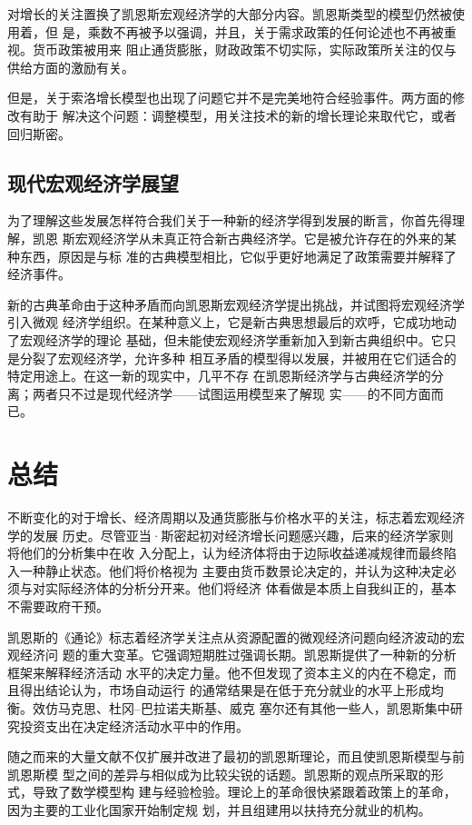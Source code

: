 对增长的关注置换了凯恩斯宏观经济学的大部分内容。凯恩斯类型的模型仍然被使用着，但
是，乘数不再被予以强调，并且，关于需求政策的任何论述也不再被重视。货币政策被用来
阻止通货膨胀，财政政策不切实际，实际政策所关注的仅与供给方面的激励有关。

但是，关于索洛增长模型也出现了问题它并不是完美地符合经验事件。两方面的修改有助于
解决这个问题：调整模型，用关注技术的新的增长理论来取代它，或者回归斯密。

\subsection{现代宏观经济学展望}

为了理解这些发展怎样符合我们关于一种新的经济学得到发展的断言，你首先得理解，凯恩
斯宏观经济学从未真正符合新古典经济学。它是被允许存在的外来的某种东西，原因是与标
准的古典模型相比，它似乎更好地满足了政策需要并解释了经济事件。

新的古典革命由于这种矛盾而向凯恩斯宏观经济学提出挑战，并试图将宏观经济学引入微观
经济学组织。在某种意义上，它是新古典思想最后的欢呼，它成功地动了宏观经济学的理论
基础，但未能使宏观经济学重新加入到新古典组织中。它只是分裂了宏观经济学，允许多种
相互矛盾的模型得以发展，并被用在它们适合的特定用途上。在这一新的现实中，几平不存
在凯恩斯经济学与古典经济学的分离；两者只不过是现代经济学——试图运用模型来了解现
实——的不同方面而已。

\section{总结}

不断变化的对于增长、经济周期以及通货膨胀与价格水平的关注，标志着宏观经济学的发展
历史。尽管亚当·斯密起初对经济增长问题感兴趣，后来的经济学家则将他们的分析集中在收
入分配上，认为经济体将由于边际收益递减规律而最终陷入一种静止状态。他们将价格视为
主要由货币数景论决定的，并认为这种决定必须与对实际经济体的分析分开来。他们将经济
体看做是本质上自我纠正的，基本不需要政府干预。

凯恩斯的《通论》标志着经济学关注点从资源配置的微观经济问题向经济波动的宏观经济问
题的重大变革。它强调短期胜过强调长期。凯恩斯提供了一种新的分析框架来解释经济活动
水平的决定力量。他不但发现了资本主义的内在不稳定，而且得出结论认为，市场自动运行
的通常结果是在低于充分就业的水平上形成均衡。效仿马克思、杜冈--巴拉诺夫斯基、威克
塞尔还有其他一些人，凯恩斯集中研究投资支出在决定经济活动水平中的作用。

随之而来的大量文献不仅扩展并改进了最初的凯恩斯理论，而且使凯恩斯模型与前凯恩斯模
型之间的差异与相似成为比较尖锐的话题。凯恩斯的观点所采取的形式，导致了数学模型构
建与经验检验。理论上的革命很快紧跟着政策上的革命，因为主要的工业化国家开始制定规
划，并且组建用以扶持充分就业的机构。

